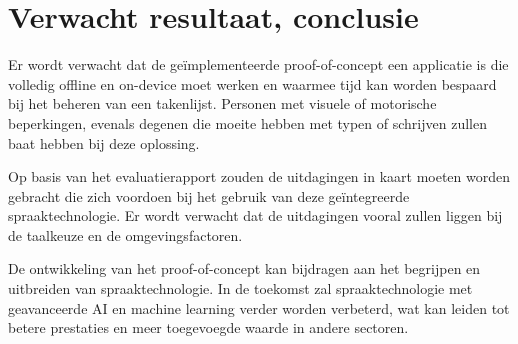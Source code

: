 

\section{Verwacht resultaat, conclusie}%
\label{sec:verwachte_resultaten}




Er wordt verwacht dat de geïmplementeerde proof-of-concept een applicatie is die volledig offline en on-device moet werken en waarmee tijd kan worden bespaard bij het beheren van een takenlijst. Personen met visuele of motorische beperkingen, evenals degenen die moeite hebben met typen of schrijven zullen baat hebben bij deze oplossing. 

Op basis van het evaluatierapport zouden de uitdagingen in kaart moeten worden gebracht die zich voordoen bij het gebruik van deze geïntegreerde spraaktechnologie. Er wordt verwacht dat de uitdagingen vooral zullen liggen bij de taalkeuze en de omgevingsfactoren.

De ontwikkeling van het proof-of-concept kan bijdragen aan het begrijpen en uitbreiden van spraaktechnologie. In de toekomst zal spraaktechnologie met geavanceerde AI en machine learning verder worden verbeterd, wat kan leiden tot betere prestaties en meer toegevoegde waarde in andere sectoren.
